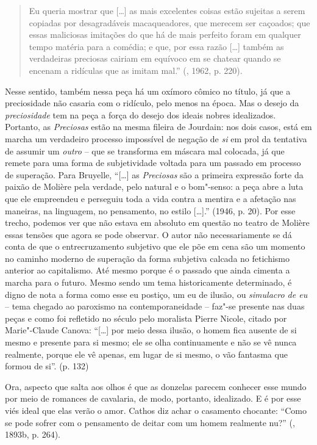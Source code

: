 \begin{quote}
Eu queria mostrar que [\ldots{}] as mais excelentes coisas estão
sujeitas a serem copiadas por desagradáveis macaqueadores, que merecem
ser caçoados; que essas maliciosas imitações do que há de mais perfeito
foram em qualquer tempo matéria para a comédia; e que, por essa razão
[\ldots{}] também as verdadeiras preciosas cairiam em equívoco em se
chatear quando se encenam a ridículas que as imitam mal.'' (,
1962, p. 220).
\end{quote}

Nesse sentido, também nessa peça há um oxímoro cômico no título, já que
a preciosidade não casaria com o ridículo, pelo menos na época. Mas o
desejo da \emph{preciosidade} tem na peça a força do desejo dos ideais
nobres idealizados. Portanto, as \emph{Preciosas} estão na mesma fileira
de Jourdain: nos dois casos, está em marcha um verdadeiro processo
impossível de negação de \emph{si} em prol da tentativa de assumir um
\emph{outro} -- que se transforma em máscara mal colocada, já que remete
para uma forma de subjetividade voltada para um passado em processo de
superação. Para Bruyelle, ``[\ldots{}] as \emph{Preciosas} são a primeira
expressão forte da paixão de Molière pela verdade, pelo natural e o
bom"-senso: a peça abre a luta que ele empreendeu e perseguiu toda a vida
contra a mentira e a afetação nas maneiras, na linguagem, no pensamento,
no estilo [\ldots{}].'' (1946, p. 20). Por esse trecho, podemos ver
que não estava em absoluto em questão no teatro de Molière essas tensões
que agora se pode observar. O autor não necessariamente se dá conta de
que o entrecruzamento subjetivo que ele põe em cena são um momento no
caminho moderno de superação da forma subjetiva calcada no fetichismo
anterior ao capitalismo. Até mesmo porque é o passado que ainda cimenta
a marcha para o futuro. Mesmo sendo um tema historicamente determinado,
é digno de nota a forma como esse eu postiço, um eu de ilusão, ou
\emph{simulacro de eu} -- tema chegado ao paroxismo na contemporaneidade
-- faz"-se presente nas duas peças e como foi refletido no século 
pelo moralista Pierre Nicole, citado por Marie"-Claude Canova:
``[\ldots{}] por meio dessa ilusão, o homem fica ausente de si mesmo
e presente para si mesmo; ele se olha continuamente e não se vê nunca
realmente, porque ele vê apenas, em lugar de si mesmo, o vão fantasma
que formou de si''. (p. 132)

Ora, aspecto que salta aos olhos é que as donzelas parecem conhecer esse
mundo por meio de romances de cavalaria, de modo, portanto, idealizado.
E é por esse viés ideal que elas verão o amor. Cathos diz achar o
casamento chocante: ``Como se pode sofrer com o pensamento de deitar com
um homem realmente nu?'' (, 1893b, p. 264).

